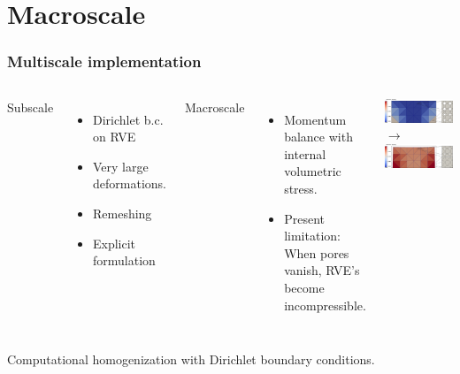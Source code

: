 \documentclass[11pt]{beamer} %
\begin{document}
\section{Macroscale}
\begin{frame}
 \frametitle{Multiscale implementation}
\begin{columns}
 Subscale
 \begin{itemize}
  \item Dirichlet b.c. on RVE
  \item Very large deformations.
  \item Remeshing
  \item Explicit formulation
 \end{itemize}

 Macroscale
 \begin{itemize}
  \item Momentum balance with internal volumetric stress.
  \item \alert{Present limitation:} When pores vanish, RVE's become incompressible.
 \end{itemize}

\begin{center}
 \includegraphics[width=0.9\linewidth]{figures/macro_sintering_2x2.0000}\\
 $\longrightarrow$\\[0.5em]
 \includegraphics[width=0.9\linewidth]{figures/macro_sintering_2x2.0176}
\end{center}
\end{columns}
 \vspace{0.5em}
 Computational homogenization with Dirichlet boundary conditions.

\end{frame}
\end{document}

